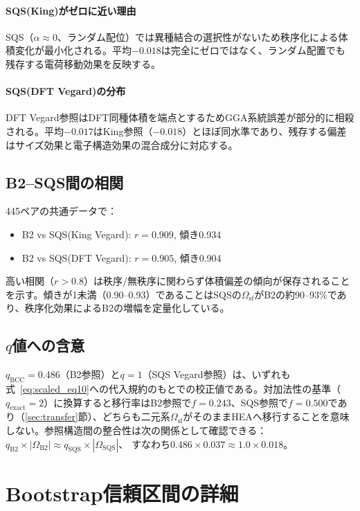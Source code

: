 \documentclass[5p,10pt]{elsarticle}
\begin{document}
\paragraph{SQS(King)がゼロに近い理由}
SQS（$\alpha \approx 0$、ランダム配位）では異種結合の選択性がないため秩序化による体積変化が最小化される。平均$-0.018$は完全にゼロではなく、ランダム配置でも残存する電荷移動効果を反映する。

\paragraph{SQS(DFT Vegard)の分布}
DFT Vegard参照はDFT同種体積を端点とするためGGA系統誤差が部分的に相殺される。平均$-0.017$はKing参照（$-0.018$）とほぼ同水準であり、残存する偏差はサイズ効果と電子構造効果の混合成分に対応する。

\subsection{B2--SQS間の相関}

445ペアの共通データで：
\begin{itemize}
  \item B2 vs SQS(King Vegard): $r = 0.909$, 傾き0.934
  \item B2 vs SQS(DFT Vegard): $r = 0.905$, 傾き0.904
\end{itemize}
高い相関（$r > 0.8$）は秩序/無秩序に関わらず体積偏差の傾向が保存されることを示す。傾きが1未満（0.90--0.93）であることはSQSの$\Omega_\text{sf}$がB2の約90--93\%であり、秩序化効果によるB2の増幅を定量化している。

\subsection{$q$値への含意}

$q_\text{BCC} = 0.486$（B2参照）と$q = 1$（SQS Vegard参照）は、いずれも式~\eqref{eq:scaled_eq10}への代入規約のもとでの校正値である。対加法性の基準（$q_\text{exact} = 2$）に換算すると移行率はB2参照で$f = 0.243$、SQS参照で$f = 0.500$であり（\ref{sec:transfer}節）、どちらも二元系$\Omega_\text{sf}$がそのままHEAへ移行することを意味しない。参照構造間の整合性は次の関係として確認できる：
$q_\text{B2} \times |\Omega_\text{B2}| \approx q_\text{SQS} \times |\Omega_\text{SQS}|$、
すなわち$0.486 \times 0.037 \approx 1.0 \times 0.018$。


\section{Bootstrap信頼区間の詳細}
\label{sec:appendix_bootstrap}
\end{document}
